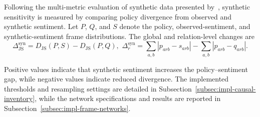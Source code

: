 Following the multi-metric evaluation of synthetic data presented
by~\cite{snoke2018general,chim2025evaluating}, synthetic sensitivity is measured by
comparing policy divergence from observed and synthetic sentiment. Let $P$, $Q$, and
$S$ denote the policy, observed-sentiment, and synthetic-sentiment frame
distributions. The global and relation-level changes are
\begin{equation}
\Delta_{\mathrm{JS}}^{\mathrm{syn}}
=
D_{\mathrm{JS}}(P,S)-D_{\mathrm{JS}}(P,Q),
\,\,
\Delta_{r}^{\mathrm{syn}}
=
\sum_{a,b}|p_{arb}-s_{arb}|
-
\sum_{a,b}|p_{arb}-q_{arb}|.
\label{eq:method-frame-synthetic-sensitivity}
\end{equation}

Positive values indicate that synthetic sentiment increases the policy--sentiment
gap, while negative values indicate reduced divergence. The implemented thresholds
and resampling settings are detailed in
Subsection~\ref{subsec:impl-causal-inventory}, while the network specifications and
results are reported in Subsection~\ref{subsec:impl-frame-networks}.


